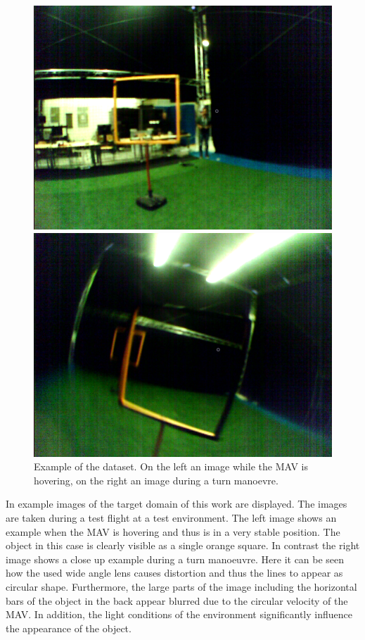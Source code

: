 \begin{figure}
	\begin{minipage}{0.49\textwidth}
		\includegraphics[width=\textwidth]{fig/real_cyberzoo2}
	\end{minipage}
	\begin{minipage}{0.49\textwidth}
		\includegraphics[width=\textwidth]{fig/real_cyberzoo1}
	\end{minipage}
	\label{fig:examples}
	\caption{Example of the  dataset. On the left an image while the \ac{MAV} is hovering, on the right an image during a turn manoevre.}
\end{figure}

In  example images of the target domain of this work are displayed. The images are taken during a test flight at a test environment. The left image shows an example when the \ac{MAV} is hovering and thus is in a very stable position. The object in this case is clearly visible as a single orange square. In contrast the right image shows a close up example during a turn manoeuvre. Here it can be seen how the used wide angle lens causes distortion and thus the lines to appear as circular shape. Furthermore, the large parts of the image including the horizontal bars of the object in the back appear blurred due to the circular velocity of the \ac{MAV}. In addition, the light conditions of the environment significantly influence the appearance of the object.

